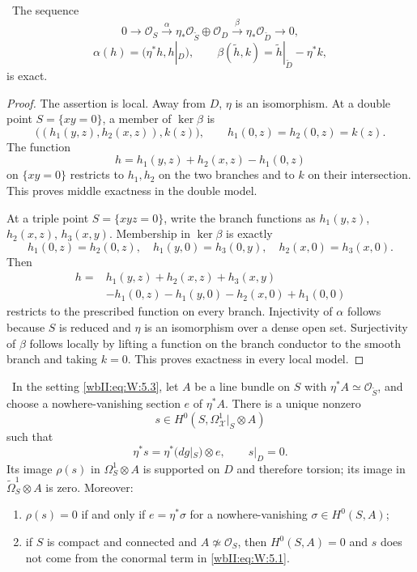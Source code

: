 \ The sequence
\[
0\longrightarrow\mathcal O_S
\xrightarrow{\alpha}
\eta_*\mathcal O_{\widetilde S}\oplus\mathcal O_D
\xrightarrow{\beta}
\eta_*\mathcal O_{\widetilde D}
\longrightarrow0,
\tag{W.5}\label{wbII:eq:W:5.5}
\]
\[
\alpha(h)=(\eta^*h,h|_D),\qquad
\beta(\widetilde h,k)=
\widetilde h|_{\widetilde D}-\eta^*k,
\]
is exact.



\begin{proof}
The assertion is local.  Away from $D$, $\eta$ is an isomorphism.
At a double point $S=\{xy=0\}$, a member of $\ker\beta$ is
\[
\bigl((h_1(y,z),h_2(x,z)),k(z)\bigr),
\qquad
h_1(0,z)=h_2(0,z)=k(z).
\]
The function
\[
h=h_1(y,z)+h_2(x,z)-h_1(0,z)
\]
on $\{xy=0\}$ restricts to $h_1,h_2$ on the two branches and to $k$ on
their intersection.  This proves middle exactness in the double model.

At a triple point $S=\{xyz=0\}$, write the branch functions as
$h_1(y,z)$, $h_2(x,z)$, $h_3(x,y)$.  Membership in $\ker\beta$ is exactly
\[
h_1(0,z)=h_2(0,z),\quad
h_1(y,0)=h_3(0,y),\quad
h_2(x,0)=h_3(x,0).
\]
Then
\[
\begin{split}
h={}&h_1(y,z)+h_2(x,z)+h_3(x,y)\\
&-h_1(0,z)-h_1(y,0)-h_2(x,0)+h_1(0,0)
\end{split}
\]
restricts to the prescribed function on every branch.  Injectivity of
$\alpha$ follows because $S$ is reduced and $\eta$ is an isomorphism over a
dense open set.  Surjectivity of $\beta$ follows locally by lifting a
function on the branch conductor to the smooth branch and taking $k=0$.
This proves exactness in every local model.
\end{proof}

\begin{theorem}
\label{wbII:prop:conductor}\label{wbII:prop:conductor-differential}
\ In the setting \eqref{wbII:eq:W:5.3}, let $A$ be a line bundle on $S$ with
$\eta^*A\simeq\mathcal O_{\widetilde S}$, and choose a nowhere-vanishing
section $e$ of $\eta^*A$.  There is a unique nonzero
\[
s\in H^0(S,\Omega^1_{\mathcal X}|_S\otimes A)
\tag{W.6}\label{wbII:eq:W:5.6}
\]
such that
\[
\eta^*s=\eta^*(dg|_S)\otimes e,\qquad s|_D=0.
\tag{W.7}\label{wbII:eq:W:5.7}
\]
Its image $\rho(s)$ in $\Omega^1_S\otimes A$ is supported on $D$ and
therefore torsion; its image in
$\widetilde\Omega^1_S\otimes A$ is zero.  Moreover:
\begin{enumerate}[label=(\alph*)]
\item $\rho(s)=0$ if and only if $e=\eta^*\sigma$ for a nowhere-vanishing
$\sigma\in H^0(S,A)$;
\item if $S$ is compact and connected and $A\not\simeq\mathcal O_S$, then
$H^0(S,A)=0$ and $s$ does not come from the conormal term in \eqref{wbII:eq:W:5.1}.
\end{enumerate}
\end{theorem}

